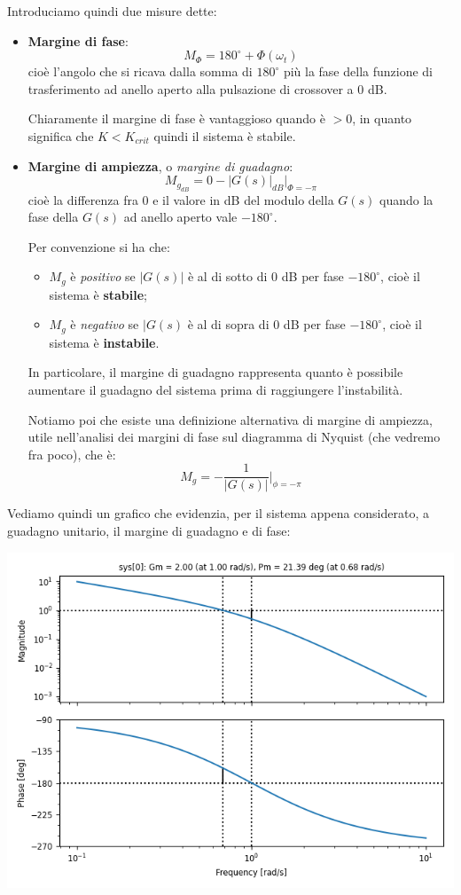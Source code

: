 \documentclass[a4paper,11pt]{article}
\begin{document}
Introduciamo quindi due misure dette:
\begin{itemize}
	\item \textbf{Margine di fase}:
		$$
		M_\Phi = 180^\circ + \Phi(\omega_t)
		$$
		cioè l'angolo che si ricava dalla somma di $180^\circ$ più la fase della funzione di trasferimento ad anello aperto alla pulsazione di crossover a 0 dB.

		Chiaramente il margine di fase è vantaggioso quando è $> 0$, in quanto significa che $K < K_{crit}$  quindi il sistema è stabile.
	\item \textbf{Margine di ampiezza}, o \textit{margine di guadagno}:
		$$
		M_{g_{dB}} = 0 - |G(s)|_{dB} \big|_{\Phi = - \pi}
		$$
		cioè la differenza fra 0 e il valore in dB del modulo della $G(s)$ quando la fase della $G(s)$ ad anello aperto vale $-180^\circ$.

		Per convenzione si ha che:
		\begin{itemize}
			\item $M_g$ è \textit{positivo} se $|G(s)|$ è al di sotto di 0 dB per fase $-180^\circ$, cioè il sistema è \textbf{stabile};
			\item $M_g$ è \textit{negativo} se $|G(s)$ è al di sopra di 0 dB per fase $-180^\circ$, cioè il sistema è \textbf{instabile}.
		\end{itemize}

		In particolare, il margine di guadagno rappresenta quanto è possibile aumentare il guadagno del sistema prima di raggiungere l'instabilità.

		Notiamo poi che esiste una definizione alternativa di margine di ampiezza, utile nell'analisi dei margini di fase sul diagramma di Nyquist (che vedremo fra poco), che è:
		$$
		M_g = -\frac{1}{|G(s)|} \Bigg|_{\phi = -\pi}
		$$
\end{itemize}

Vediamo quindi un grafico che evidenzia, per il sistema appena considerato, a guadagno unitario, il margine di guadagno e di fase:

\begin{center}
	\includegraphics[scale=0.8]{../figures/margins.png}
\end{center}
\end{document}
